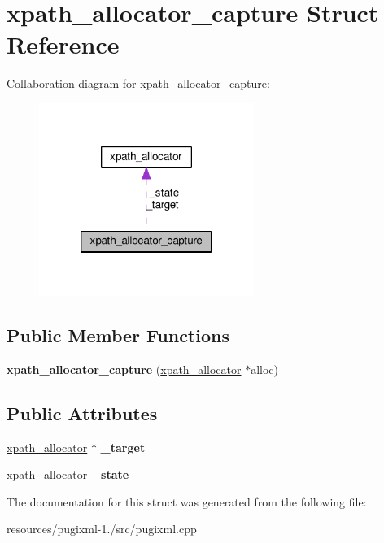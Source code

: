 \hypertarget{structxpath__allocator__capture}{\section{xpath\+\_\+allocator\+\_\+capture Struct Reference}
\label{structxpath__allocator__capture}
}


Collaboration diagram for xpath\+\_\+allocator\+\_\+capture\+:
\nopagebreak
\begin{figure}[H]
\begin{center}
\leavevmode
\includegraphics[width=198pt]{structxpath__allocator__capture__coll__graph}
\end{center}
\end{figure}
\subsection*{Public Member Functions}
\begin{DoxyCompactItemize}
\item 
\hypertarget{structxpath__allocator__capture_af6925e08c811c0cbda74d4da5b9f2eed}{{\bfseries xpath\+\_\+allocator\+\_\+capture} (\hyperlink{classxpath__allocator}{xpath\+\_\+allocator} $\ast$alloc)}\label{structxpath__allocator__capture_af6925e08c811c0cbda74d4da5b9f2eed}

\end{DoxyCompactItemize}
\subsection*{Public Attributes}
\begin{DoxyCompactItemize}
\item 
\hypertarget{structxpath__allocator__capture_a382acca931c691699ec84a03fb060cf4}{\hyperlink{classxpath__allocator}{xpath\+\_\+allocator} $\ast$ {\bfseries \+\_\+target}}\label{structxpath__allocator__capture_a382acca931c691699ec84a03fb060cf4}

\item 
\hypertarget{structxpath__allocator__capture_a275859dc99681c12b42ee4f51b713d39}{\hyperlink{classxpath__allocator}{xpath\+\_\+allocator} {\bfseries \+\_\+state}}\label{structxpath__allocator__capture_a275859dc99681c12b42ee4f51b713d39}

\end{DoxyCompactItemize}


The documentation for this struct was generated from the following file\+:\begin{DoxyCompactItemize}
\item 
resources/pugixml-\/1./src/pugixml.\+cpp\end{DoxyCompactItemize}
